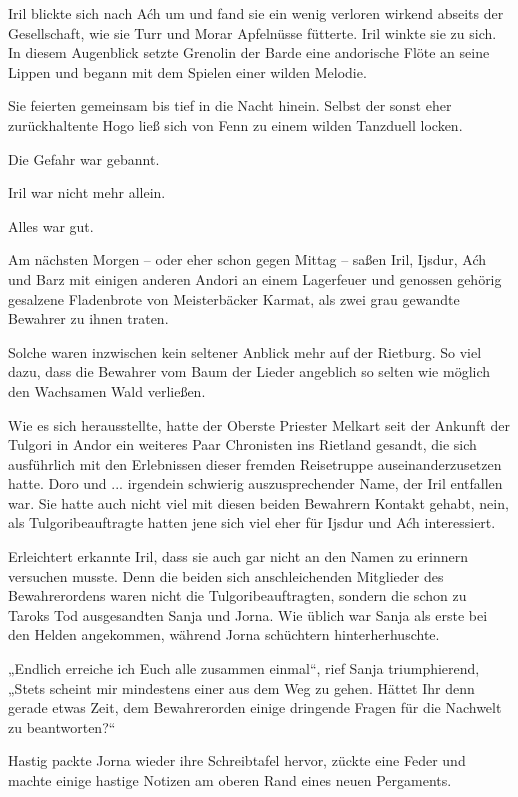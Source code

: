 Iril blickte sich nach Aćh um und fand sie ein wenig verloren wirkend abseits der Gesellschaft, wie sie Turr und Morar Apfelnüsse fütterte. Iril winkte sie zu sich. In diesem Augenblick setzte Grenolin der Barde eine andorische Flöte an seine Lippen und begann mit dem Spielen einer wilden Melodie.

Sie feierten gemeinsam bis tief in die Nacht hinein. Selbst der sonst eher zurückhaltente Hogo ließ sich von Fenn zu einem wilden Tanzduell locken.

Die Gefahr war gebannt.

Iril war nicht mehr allein.

Alles war gut.\bigskip


Am nächsten Morgen – oder eher schon gegen Mittag – saßen Iril, Ijsdur, Aćh und Barz mit einigen anderen Andori an einem Lagerfeuer und genossen gehörig gesalzene Fladenbrote von Meisterbäcker Karmat, als zwei grau gewandte Bewahrer zu ihnen traten.

Solche waren inzwischen kein seltener Anblick mehr auf der Rietburg. So viel dazu, dass die Bewahrer vom Baum der Lieder angeblich so selten wie möglich den Wachsamen Wald verließen.

Wie es sich herausstellte, hatte der Oberste Priester Melkart seit der Ankunft der Tulgori in Andor ein weiteres Paar Chronisten ins Rietland gesandt, die sich ausführlich mit den Erlebnissen dieser fremden Reisetruppe auseinanderzusetzen hatte. Doro und ... irgendein schwierig auszusprechender Name, der Iril entfallen war. Sie hatte auch nicht viel mit diesen beiden Bewahrern Kontakt gehabt, nein, als Tulgoribeauftragte hatten jene sich viel eher für Ijsdur und Aćh interessiert.

Erleichtert erkannte Iril, dass sie auch gar nicht an den Namen zu erinnern versuchen musste. Denn die beiden sich anschleichenden Mitglieder des Bewahrerordens waren nicht die Tulgoribeauftragten, sondern die schon zu Taroks Tod ausgesandten Sanja und Jorna. Wie üblich war Sanja als erste bei den Helden angekommen, während Jorna schüchtern hinterherhuschte.

„Endlich erreiche ich Euch alle zusammen einmal“, rief Sanja triumphierend, „Stets scheint mir mindestens einer aus dem Weg zu gehen. Hättet Ihr denn gerade etwas Zeit, dem Bewahrerorden einige dringende Fragen für die Nachwelt zu beantworten?“

Hastig packte Jorna wieder ihre Schreibtafel hervor, zückte eine Feder und machte einige hastige Notizen am oberen Rand eines neuen Pergaments.

